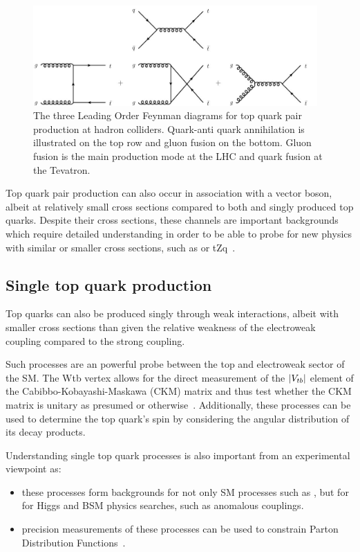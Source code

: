 \begin{figure}[htbp]
\begin{center}
\includegraphics[width=0.97\textwidth]{figs/top-physics/ttbar_feyn.jpg}
\caption{The three Leading Order Feynman diagrams for top quark pair production at hadron colliders. Quark-anti quark annihilation is illustrated on the top row and gluon fusion on the bottom. Gluon fusion is the main production mode at the LHC and quark fusion at the Tevatron.}
\label{fig:feyn_ttbar}
\end{center}
\end{figure}

Top quark pair production can also occur in association with a vector boson, albeit at relatively small cross sections compared to both \ttbar and singly produced top quarks.
Despite their cross sections, these channels are important backgrounds which require detailed understanding in order to be able to probe for new physics with similar or smaller cross sections, such as \ttH or tZq~\cite{Khachatryan:2014ewa}.

\subsection{Single top quark production}\label{subsec:singleTopTheory}
Top quarks can also be produced singly through weak interactions, albeit with smaller cross sections than \ttbar given the relative weakness of the electroweak coupling compared to the strong coupling.

Such processes are an powerful probe between the top and electroweak sector of the SM.
The Wtb vertex allows for the direct measurement of the $\lvert V_{tb} \rvert$ element of the Cabibbo-Kobayashi-Maskawa (CKM) matrix and thus test whether the CKM matrix is unitary as presumed or otherwise~\cite{Shibata:2008sy}.
Additionally, these processes can be used to determine the top quark's spin by considering the angular distribution of its decay products.

Understanding single top quark processes is also important from an experimental viewpoint as:
\begin{itemize}
\item these processes form backgrounds for not only SM processes such as \ttbar, but for for Higgs and BSM physics searches, such as anomalous couplings.
\item precision measurements of these processes can be used to constrain Parton Distribution Functions~\cite{Guffanti:2010yu}.
\end{itemize}

